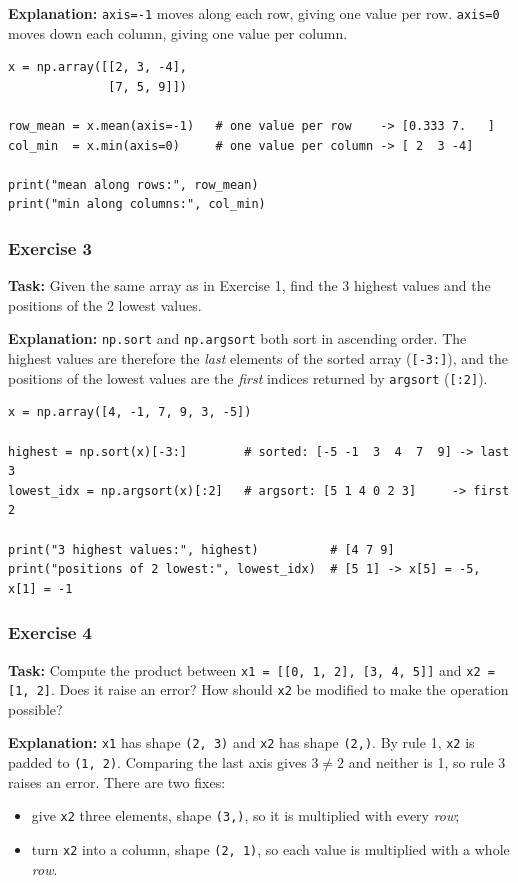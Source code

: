 \textbf{Explanation:} \texttt{axis=-1} moves along each row, giving one value per row. \texttt{axis=0} moves down each column, giving one value per column.

\begin{lstlisting}[caption={Aggregations along different axes.}]
x = np.array([[2, 3, -4],
              [7, 5, 9]])

row_mean = x.mean(axis=-1)   # one value per row    -> [0.333 7.   ]
col_min  = x.min(axis=0)     # one value per column -> [ 2  3 -4]

print("mean along rows:", row_mean)
print("min along columns:", col_min)
\end{lstlisting}

\subsubsection{Exercise 3}
\textbf{Task:} Given the same array as in Exercise 1, find the 3 highest values and the positions of the 2 lowest values.

\textbf{Explanation:} \texttt{np.sort} and \texttt{np.argsort} both sort in ascending order. The highest values are therefore the \emph{last} elements of the sorted array (\texttt{[-3:]}), and the positions of the lowest values are the \emph{first} indices returned by \texttt{argsort} (\texttt{[:2]}).

\begin{lstlisting}[caption={Highest values with sort, lowest positions with argsort.}]
x = np.array([4, -1, 7, 9, 3, -5])

highest = np.sort(x)[-3:]        # sorted: [-5 -1  3  4  7  9] -> last 3
lowest_idx = np.argsort(x)[:2]   # argsort: [5 1 4 0 2 3]     -> first 2

print("3 highest values:", highest)          # [4 7 9]
print("positions of 2 lowest:", lowest_idx)  # [5 1] -> x[5] = -5, x[1] = -1
\end{lstlisting}

\subsubsection{Exercise 4}
\textbf{Task:} Compute the product between \texttt{x1 = [[0, 1, 2], [3, 4, 5]]} and \texttt{x2 = [1, 2]}. Does it raise an error? How should \texttt{x2} be modified to make the operation possible?

\textbf{Explanation:} \texttt{x1} has shape \texttt{(2, 3)} and \texttt{x2} has shape \texttt{(2,)}. By rule 1, \texttt{x2} is padded to \texttt{(1, 2)}. Comparing the last axis gives $3 \neq 2$ and neither is 1, so rule 3 raises an error. There are two fixes:
\begin{itemize}
    \item give \texttt{x2} three elements, shape \texttt{(3,)}, so it is multiplied with every \emph{row};
    \item turn \texttt{x2} into a column, shape \texttt{(2, 1)}, so each value is multiplied with a whole \emph{row}.
\end{itemize}

